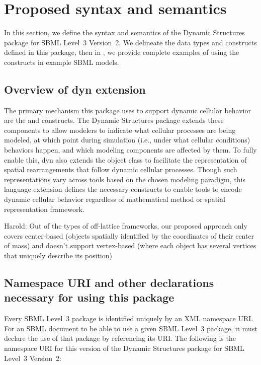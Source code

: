 
\section{Proposed syntax and semantics}
\label{sec:syntax}

In this section, we define the syntax and semantics of the Dynamic Structures package for SBML Level~3 Version~2. We delineate the data types and constructs defined in this package, then in , we provide complete examples of using the constructs in example SBML models.

\subsection{Overview of dyn extension}
\label{subsec:overview}

The primary mechanism this package uses to support dynamic cellular behavior are the \Event and \SBase constructs. The Dynamic Structures package extends these components to allow modelers to indicate what cellular processes are being modeled, at which point during simulation (i.e., under what cellular conditions) behaviors happen, and which modeling components are affected by them. To fully enable this, dyn also extends the \Compartment object class to facilitate the representation of spatial rearrangements that follow dynamic cellular processes. Though such representations vary across tools based on the chosen modeling paradigm, this language extension defines the necessary constructs to enable tools to encode dynamic cellular behavior regardless of mathematical method or spatial representation framework.

{\color{red} Harold: \notice Out of the types of off-lattice frameworks, our proposed approach only covers center-based (objects spatially identified by the coordinates of their center of mass) and doesn't support vertex-based (where each object has several vertices that uniquely describe its position)}

\subsection{Namespace URI and other declarations necessary for using this package}
\label{subsec:xml-namespace}

Every SBML Level~3 package is identified uniquely by an XML namespace URI.
For an SBML document to be able to use a given SBML Level~3 package, it
must declare the use of that package by referencing its URI.  The following
is the namespace URI for this version of the Dynamic Structures
package for SBML Level~3 Version~2:

